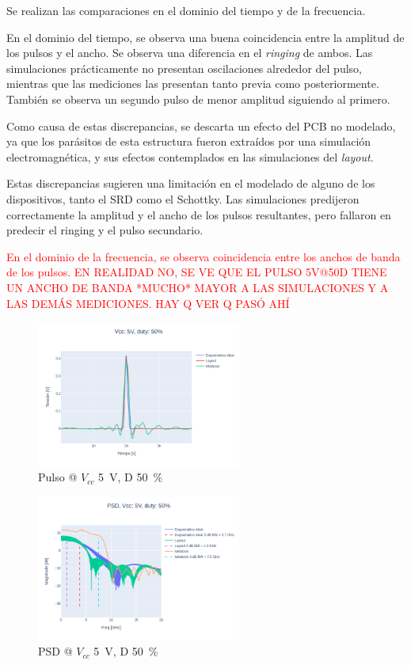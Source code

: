 Se realizan las comparaciones en el dominio del tiempo y de la frecuencia.

En el dominio del tiempo, se observa una buena coincidencia entre la amplitud
de los pulsos y el ancho. Se observa una diferencia en el \textit{ringing} de ambos.
Las simulaciones prácticamente no presentan oscilaciones alrededor del pulso,
mientras que las mediciones las presentan tanto previa como posteriormente.
También se observa un segundo pulso de menor amplitud siguiendo al primero.

Como causa de estas discrepancias, se descarta un efecto del PCB no modelado, 
ya que los parásitos de esta estructura fueron extraídos por una simulación 
electromagnética, y sus efectos contemplados en las simulaciones del \textit{layout}.

Estas  discrepancias sugieren una limitación en el modelado de alguno de los 
dispositivos, tanto el SRD como el Schottky. Las simulaciones predijeron correctamente
la amplitud y el ancho de los pulsos resultantes, pero fallaron en predecir 
el ringing y el pulso secundario.

\textcolor{red}{  
En el dominio de la frecuencia, se observa coincidencia entre los anchos de banda de los
pulsos.
EN REALIDAD NO, SE VE QUE EL PULSO 5V@50D TIENE UN ANCHO DE BANDA *MUCHO* MAYOR A 
LAS SIMULACIONES Y A LAS DEMÁS MEDICIONES.
HAY Q VER Q PASÓ AHÍ
}

\begin{figure}
  \centering
    \includegraphics[width=0.6\textwidth]{images/plots/Vcc_5V_duty_50_time_domain.png}
    \caption{Pulso @ $V_{cc}$ \qty{5}{\volt}, D \qty{50}{\percent} }
    \label{fig:plots_5v_50}
\end{figure}

\begin{figure}
  \centering
    \includegraphics[width=0.6\textwidth]{images/plots/Vcc_5V_duty_50_psd.png}
    \caption{PSD @ $V_{cc}$ \qty{5}{\volt}, D \qty{50}{\percent} }
    \label{fig:psd_5v_50}
\end{figure}

